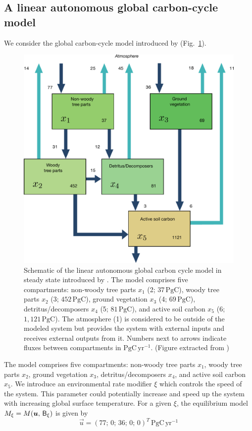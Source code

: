 \documentclass[smallextended]{svjour3}
\newcommand{\peta}{\mathrm{P}}
\newcommand{\gC}{\mathrm{gC}}
\newcommand{\yr}{\mathrm{yr}}
\newcommand{\transpose}{T}
\begin{document}
\subsection{A linear autonomous global carbon-cycle model}
\label{sec:example_1}
We consider the global carbon-cycle model introduced by \citet{Emanuel1981} (Fig.~\ref{fig:Emanuel_model}).
\begin{figure}%
    \centering
    \includegraphics[width=0.5\linewidth]{figs/EmanuelModelStructure.pdf}
    \caption{Schematic of the linear autonomous global carbon cycle model in steady state introduced by \citet{Emanuel1981}. 
      The model comprises five compartments: non-woody tree parts $x_1$ (2; $37\,\peta\gC$), woody tree parts $x_2$ (3; $452\,\peta\gC$), ground vegetation $x_3$ (4; $69\,\peta\gC$), detritus/decomposers $x_4$ (5; $81\,\peta\gC$), and active soil carbon $x_5$ (6; $1,121\,\peta\gC$). The atmosphere (1) is considered to be outside of the modeled system but provides the system with external inputs and receives external outputs from it. Numbers next to arrows indicate fluxes between compartments in $\peta\gC\,\yr^{-1}$. (Figure extracted from \citealt{Emanuel1981})}\label{fig:Emanuel_model}
\end{figure}
The model comprises five compartments: non-woody tree parts $x_1$, woody tree parts $x_2$, ground vegetation $x_3$, detritus/decomposers $x_4$, and active soil carbon $x_5$.
We introduce an environmental rate modifier $\xi$ which controls the speed of the system.
This parameter could potentially increase and speed up the system with increasing global surface temperature.
For a given $\xi$, the equilibrium model $M_\xi=M(\vec{u},\,\tens{B}_\xi)$ is given by
\begin{equation*}
  \vec{u} = (77;\,0;\,36;\,0;\,0)^{\transpose}\, \peta\gC\,\yr^{-1}
\end{equation*}
\end{document}
